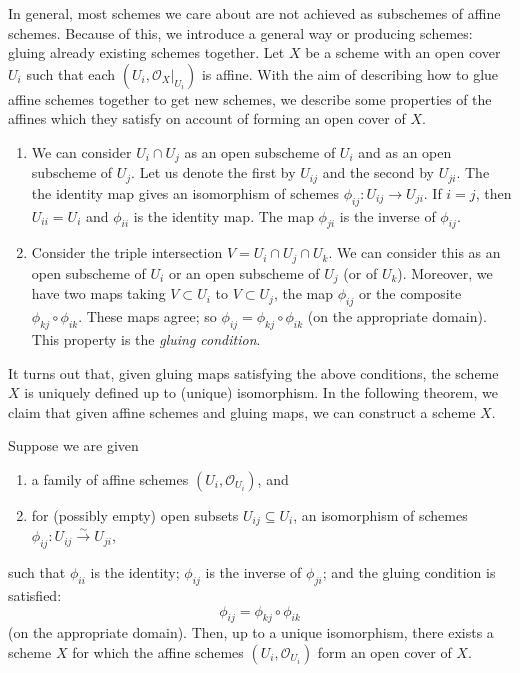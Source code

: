 In general, most schemes we care about are not achieved as subschemes of affine schemes. Because of this, we introduce a general way or producing schemes: gluing already existing schemes together. 
Let $X$ be a scheme with an open cover $U_i$ such that each $(U_i, \mathcal{O}_X|_{U_i})$ is affine. With the aim of describing how to glue affine schemes together to get new schemes, we describe some properties of the affines which they  satisfy on account of forming an open cover of $X$.
\begin{enumerate}
\item We can consider \(U_{i} \cap U_j\) as an open subscheme of \(U_i\) and as an open subscheme of \(U_j\).
  Let us denote the first by \(U_{ij}\) and the second by \(U_{ji}\).
  The the identity map gives an isomorphism of schemes \(\phi_{ij} \colon U_{ij} \to U_{ji}\).
  If $i = j$, then $U_{ii} = U_i$ and $\phi_{ii}$ is the identity map.
  The map \(\phi_{ji}\) is the inverse of \(\phi_{ij}\).
  
\item Consider the triple intersection $V = U_i \cap U_j \cap U_k$.
  We can consider this as an open subscheme of \(U_i\) or an open subscheme of \(U_j\) (or of \(U_k\)).
  Moreover, we have two maps taking $V \subset U_i$ to $V \subset U_j$, the map $\phi_{ij}$ or the composite $\phi_{kj} \circ \phi_{ik}$.  These maps agree; so $\phi_{ij} = \phi_{kj} \circ \phi_{ik}$ (on the appropriate domain). This property is the \emph{gluing condition}.
\end{enumerate}

It turns out that, given gluing maps satisfying the above conditions, the scheme $X$ is uniquely defined up to (unique) isomorphism. In the following theorem, we claim that given affine schemes and gluing maps, we can construct a scheme $X$.

\begin{theorem}
  Suppose we are given
  \begin{enumerate}
  \item a family of affine schemes $(U_i, \mathcal{O}_{U_i})$, and
  \item for (possibly empty) open subsets $U_{ij} \subseteq U_i$, an isomorphism of schemes $\phi_{ij} \colon U_{ij} \xrightarrow{\sim} U_{ji}$, 
  \end{enumerate}
  such that \(\phi_{ii}\) is the identity; \(\phi_{ij}\) is the inverse of \(\phi_{ji}\); and the gluing condition is satisfied:
  \[ \phi_{ij} = \phi_{kj} \circ \phi_{ik}\]
  (on the appropriate domain).
  Then, up to a unique isomorphism, there exists a scheme $X$ for which the affine schemes $(U_i, \mathcal{O}_{U_i})$ form an open cover of $X$.
\end{theorem}

